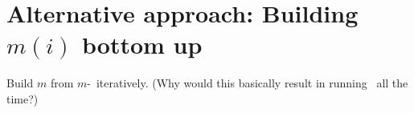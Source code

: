 %    
%    
%    
%    
%    
%    
%    




\section{Alternative approach: Building $m(i)$ bottom up}

Build $m$ from $m$-\CompDist\ iteratively. (Why would this basically result in running \CompDist\ all the time?)






